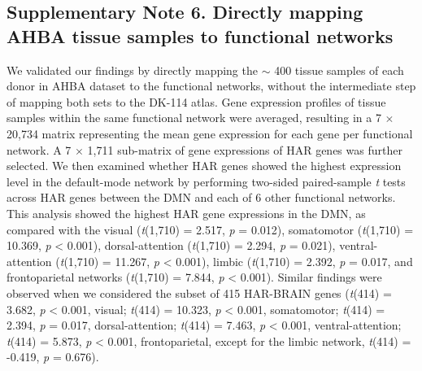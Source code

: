 \begin{refsection}
\subsection*{Supplementary Note 6. Directly mapping AHBA tissue samples to functional networks}
We validated our findings by directly mapping the $ \sim $ 400 tissue samples of each donor in AHBA dataset to the functional networks, without the intermediate step of mapping both sets to the DK-114 atlas. Gene expression profiles of tissue samples within the same functional network were averaged, resulting in a 7 $ \times $  20,734 matrix representing the mean gene expression for each gene per functional network. A 7 $ \times $  1,711 sub-matrix of gene expressions of HAR genes was further selected. We then examined whether HAR genes showed the highest expression level in the default-mode network by performing two-sided paired-sample \textit{t} tests across HAR genes between the DMN and each of 6 other functional networks. This analysis showed the highest HAR gene expressions in the DMN, as compared with the visual (\textit{t}(1,710) = 2.517, \textit{p} = 0.012), somatomotor (\textit{t}(1,710) = 10.369, \textit{p} < 0.001), dorsal-attention (\textit{t}(1,710) = 2.294, \textit{p} = 0.021), ventral-attention (\textit{t}(1,710) = 11.267, \textit{p} < 0.001), limbic (\textit{t}(1,710) = 2.392, \textit{p} = 0.017, and frontoparietal networks (\textit{t}(1,710) = 7.844, \textit{p} < 0.001). Similar findings were observed when we considered the subset of 415 HAR-BRAIN genes (\textit{t}(414) = 3.682, \textit{p} < 0.001, visual; \textit{t}(414) = 10.323, \textit{p} < 0.001, somatomotor; \textit{t}(414) = 2.394, \textit{p} = 0.017, dorsal-attention; \textit{t}(414) = 7.463, \textit{p} < 0.001, ventral-attention; \textit{t}(414) = 5.873, \textit{p} < 0.001, frontoparietal, except for the limbic network, \textit{t}(414) = -0.419, \textit{p} = 0.676).


\end{refsection}
